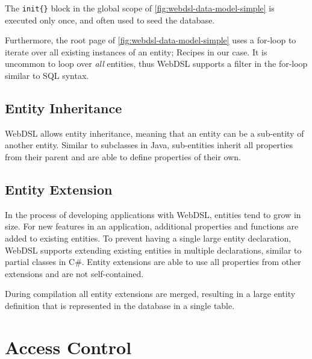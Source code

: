     The \texttt{init\{\}} block in the global scope of \cref{fig:webdsl-data-model-simple} is executed only once, and often used to seed the database.

    Furthermore, the root page of \cref{fig:webdsl-data-model-simple} uses a for-loop to iterate over all existing instances of an entity; Recipes in our case. It is uncommon to loop over \textit{all} entities, thus WebDSL supports a filter in the for-loop similar to SQL syntax.

    \subsection{\label{subsec:webdsl-inheritance}Entity Inheritance}

      WebDSL allows entity inheritance, meaning that an entity can be a sub-entity of another entity. Similar to subclasses in Java, sub-entities inherit all properties from their parent and are able to define properties of their own.

    \subsection{\label{subsec:webdsl-entity-extension}Entity Extension}

      In the process of developing applications with WebDSL, entities tend to grow in size. For new features in an application, additional properties and functions are added to existing entities. To prevent having a single large entity declaration, WebDSL supports extending existing entities in multiple declarations, similar to partial classes in C\#. Entity extensions are able to use all properties from other extensions and are not self-contained.

      During compilation all entity extensions are merged, resulting in a large entity definition that is represented in the database in a single table.

  \section{\label{sec:access-control}Access Control}


